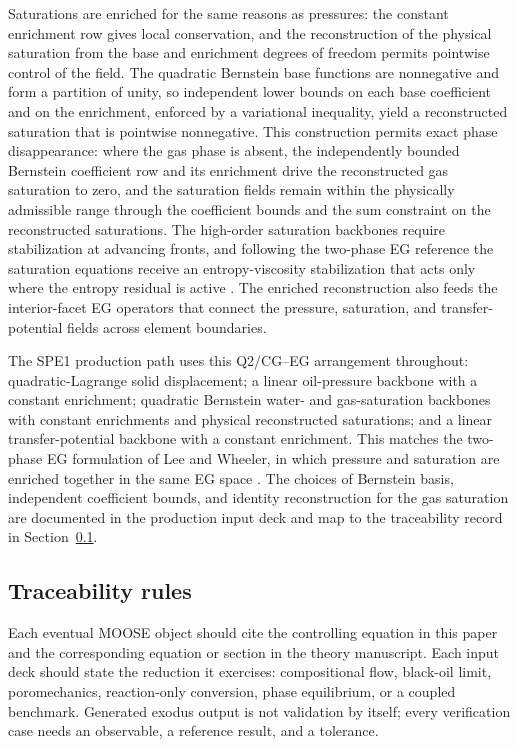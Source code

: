 Saturations are enriched for the same reasons as pressures: the constant
enrichment row gives local conservation, and the reconstruction of the physical
saturation from the base and enrichment degrees of freedom permits pointwise
control of the field.  The quadratic Bernstein base functions are nonnegative
and form a partition of unity, so independent lower bounds on each base
coefficient and on the enrichment, enforced by a variational inequality, yield
a reconstructed saturation that is pointwise nonnegative.  This construction
permits exact phase disappearance: where the gas phase is absent, the
independently bounded Bernstein coefficient row and its enrichment drive the
reconstructed gas saturation to zero, and the saturation fields remain within
the physically admissible range through the coefficient bounds and the
sum constraint on the reconstructed saturations.  The high-order saturation
backbones require stabilization at advancing fronts, and following the
two-phase EG reference the saturation equations receive an entropy-viscosity
stabilization that acts only where the entropy residual is active
\cite{lee2018eg_twophase}.  The enriched reconstruction also feeds the
interior-facet EG operators that connect the pressure, saturation, and
transfer-potential fields across element boundaries.

The SPE1 production path uses this Q2/CG--EG arrangement throughout:
quadratic-Lagrange solid displacement; a linear oil-pressure backbone with a
constant enrichment; quadratic Bernstein water- and gas-saturation backbones
with constant enrichments and physical reconstructed saturations; and a linear
transfer-potential backbone with a constant enrichment.  This matches the
two-phase EG formulation of Lee and Wheeler, in which pressure and saturation
are enriched together in the same EG space \cite{lee2018eg_twophase}.  The
choices of Bernstein basis, independent coefficient bounds, and identity
reconstruction for the gas saturation are documented in the production input
deck and map to the traceability record in
Section~\ref{sec:traceability_rules}.

\subsection{Traceability rules}
\label{sec:traceability_rules}

Each eventual MOOSE object should cite the controlling equation in this paper
and the corresponding equation or section in the theory manuscript.  Each input
deck should state the reduction it exercises: compositional flow, black-oil
limit, poromechanics, reaction-only conversion, phase equilibrium, or a coupled
benchmark.  Generated exodus output is not validation by itself; every
verification case needs an observable, a reference result, and a tolerance.
